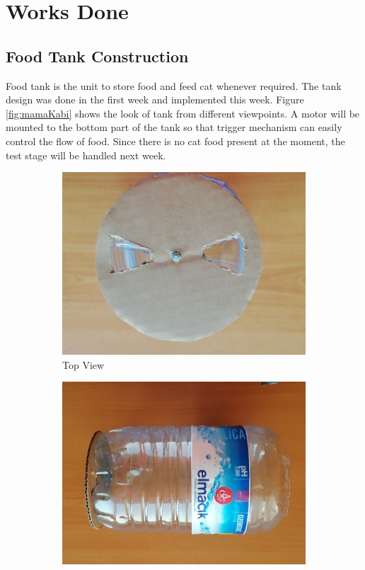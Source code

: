 \section{Works Done}
\label{sec:worksDone}
\subsection{Food Tank Construction}
Food tank is the unit to store food and feed cat whenever required. The tank design was done in the first week and implemented this week. Figure \ref{fig:mamaKabi} shows the look of tank from different viewpoints. A motor will be mounted to the bottom part of the tank so that trigger mechanism can easily control the flow of food. Since there is no cat food present at the moment, the test stage will be handled next week.

\begin{figure}[h]
    \centering
    \begin{subfigure}[b]{0.49\textwidth}
        \includegraphics[width=\textwidth]{img/tank1.jpg}
        \caption{Top View}
        \label{fig:mamaKabi1}
    \end{subfigure}
    \begin{subfigure}[b]{0.49\textwidth}
        \includegraphics[width=\textwidth]{img/tank2.jpg}

\end{subfigure}
\end{figure}
